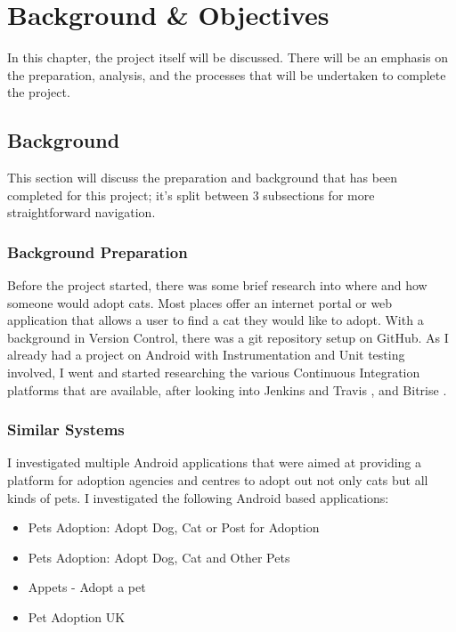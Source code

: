 \chapter{Background \& Objectives}

In this chapter, the project itself will be discussed. There will be an emphasis on the preparation, analysis, and the processes that will be undertaken to complete the project.

\section{Background}

This section will discuss the preparation and background that has been completed for this project; it's split between 3 subsections for more straightforward navigation.

\subsection{Background Preparation} \label{BACKPREP}
Before the project started, there was some brief research into where and how someone would adopt cats. Most places offer an internet portal or web application that allows a user to find a cat they would like to adopt. With a background in Version Control, there was a git repository setup on GitHub. As I already had a project on Android with Instrumentation and Unit testing involved, I went and started researching the various Continuous Integration platforms that are available, after looking into Jenkins \cite{JENKINS} and Travis \cite{TRAVIS}, and Bitrise \cite{BITRISE}.

\subsection{Similar Systems}
I investigated multiple Android applications that were aimed at providing a platform for adoption agencies and centres to adopt out not only cats but all kinds of pets. I investigated the following Android based applications:

\begin{itemize}
    \item Pets Adoption: Adopt Dog, Cat or Post for Adoption \cite{PETSADOPTION}
    \item Pets Adoption: Adopt Dog, Cat and Other Pets \cite{PETSADOPTION1}
    \item Appets - Adopt a pet \cite{APPETS}
    \item Pet Adoption UK \cite{PETADOPTIONUK}
\end{itemize}

